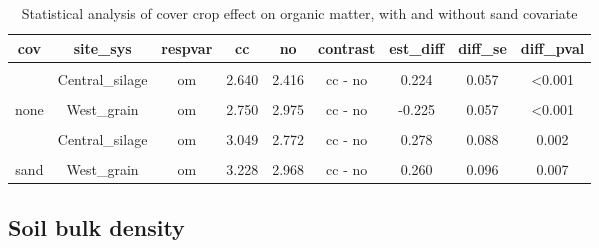 \documentclass[
]{article}
\begin{document}
\begin{table}[H]

\caption{\label{tab:omstats}Statistical analysis of cover crop effect on organic matter, with and without sand covariate}
\centering
\begin{tabular}[t]{ccccccccc}
\toprule
cov & site\_sys & respvar & cc & no & contrast & est\_diff & diff\_se & diff\_pval\\
\midrule
\cellcolor{gray!6}{none} & \cellcolor{gray!6}{Central\_grain} & \cellcolor{gray!6}{om} & \cellcolor{gray!6}{2.360} & \cellcolor{gray!6}{2.480} & \cellcolor{gray!6}{cc - no} & \cellcolor{gray!6}{-0.120} & \cellcolor{gray!6}{0.051} & \cellcolor{gray!6}{0.02}\\
 & Central\_silage & om & 2.640 & 2.416 & cc - no & 0.224 & 0.057 & <0.001\\

\cellcolor{gray!6}{none} & \cellcolor{gray!6}{East\_grain} & \cellcolor{gray!6}{om} & \cellcolor{gray!6}{3.575} & \cellcolor{gray!6}{3.675} & \cellcolor{gray!6}{cc - no} & \cellcolor{gray!6}{-0.100} & \cellcolor{gray!6}{0.057} & \cellcolor{gray!6}{0.082}\\
\multirow{-4}{*}{\centering\arraybackslash none} & West\_grain & om & 2.750 & 2.975 & cc - no & -0.225 & 0.057 & <0.001\\
\cmidrule{1-9}
\cellcolor{gray!6}{sand} & \cellcolor{gray!6}{Central\_grain} & \cellcolor{gray!6}{om} & \cellcolor{gray!6}{3.034} & \cellcolor{gray!6}{3.066} & \cellcolor{gray!6}{cc - no} & \cellcolor{gray!6}{-0.032} & \cellcolor{gray!6}{0.082} & \cellcolor{gray!6}{0.696}\\
 & Central\_silage & om & 3.049 & 2.772 & cc - no & 0.278 & 0.088 & 0.002\\

\cellcolor{gray!6}{sand} & \cellcolor{gray!6}{East\_grain} & \cellcolor{gray!6}{om} & \cellcolor{gray!6}{2.290} & \cellcolor{gray!6}{2.105} & \cellcolor{gray!6}{cc - no} & \cellcolor{gray!6}{0.185} & \cellcolor{gray!6}{0.093} & \cellcolor{gray!6}{0.048}\\
\multirow{-4}{*}{\centering\arraybackslash sand} & West\_grain & om & 3.228 & 2.968 & cc - no & 0.260 & 0.096 & 0.007\\
\bottomrule
\end{tabular}
\end{table}

\hypertarget{soil-bulk-density}{%
\subsection{Soil bulk density}\label{soil-bulk-density}}
\end{document}
